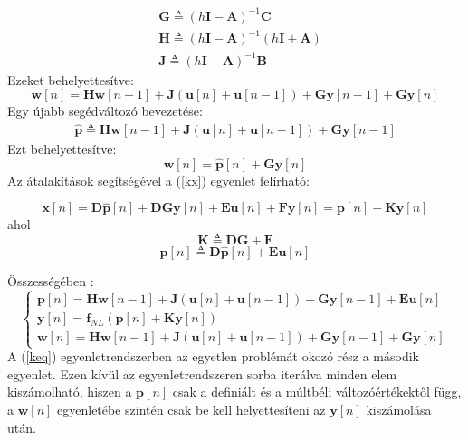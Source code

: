 \begin{eqnarray}
    &\mathbf{G} \triangleq (h\mathbf{I}-\mathbf{A})^{-1}\mathbf{C}
    \label{G}\\
    &\mathbf{H} \triangleq (h\mathbf{I}-\mathbf{A})^{-1}(h\mathbf{I}+\mathbf{A})
    \label{H}\\
    &\mathbf{J} \triangleq (h\mathbf{I}-\mathbf{A})^{-1}\mathbf{B}
    \label{J}
\end{eqnarray}
Ezeket behelyettesítve:
\begin{equation}
    \mathbf{w}[n]=\mathbf{Hw}[n-1]+\mathbf{J}(\mathbf{u}[n]+\mathbf{u}[n-1])+\mathbf{Gy}[n-1]+\mathbf{Gy}[n]
\end{equation}
Egy újabb segédváltozó bevezetése:
\begin{eqnarray}
    \mathbf{\hat{p}} \triangleq \mathbf{Hw}[n-1]+\mathbf{J}(\mathbf{u}[n]+\mathbf{u}[n-1])+\mathbf{Gy}[n-1]
    \label{pk}
\end{eqnarray}
Ezt behelyettesítve:
\begin{equation}
    \mathbf{w}[n]=\mathbf{\hat{p}}[n]+\mathbf{Gy}[n]
    \label{wn}
\end{equation}
Az átalakítások segítségével a (\ref{kx}) egyenlet felírható:

\begin{equation}
    \mathbf{x}[n]=\mathbf{D\hat{p}}[n]+\mathbf{DGy}[n]+\mathbf{Eu}[n]+\mathbf{Fy}[n] = \mathbf{p}[n]+\mathbf{Ky}[n]
\end{equation}
ahol
\begin{equation}
    \mathbf{K} \triangleq \mathbf{DG}+\mathbf{F}
    \label{K}
\end{equation}
\begin{equation}
    \mathbf{p}[n] \triangleq \mathbf{D\hat{p}}[n]+\mathbf{Eu}[n]
\end{equation}

Összességében \cite{borin}:
\begin{equation}
    \begin{cases}
        \mathbf{p}[n]=\mathbf{Hw}[n-1]+\mathbf{J}(\mathbf{u}[n]+\mathbf{u}[n-1])+\mathbf{Gy}[n-1]+\mathbf{Eu}[n] \\
        \mathbf{y}[n]=\mathbf{f}_{NL}(\mathbf{p}[n]+\mathbf{Ky}[n]) \\
        \mathbf{w}[n]=\mathbf{Hw}[n-1]+\mathbf{J}(\mathbf{u}[n]+\mathbf{u}[n-1])+\mathbf{Gy}[n-1]+\mathbf{Gy}[n]
    \end{cases}
    \label{keq}
\end{equation}
A (\ref{keq}) egyenletrendszerben az egyetlen problémát okozó rész a második egyenlet. 
Ezen kívül az egyenletrendszeren sorba iterálva minden elem kiszámolható, hiszen a $\mathbf{p}[n]$ 
csak a definiált és a múltbéli változóértékektől függ, a $\mathbf{w}[n]$ egyenletébe szintén csak be 
kell helyettesíteni az $\mathbf{y}[n]$ kiszámolása után.

